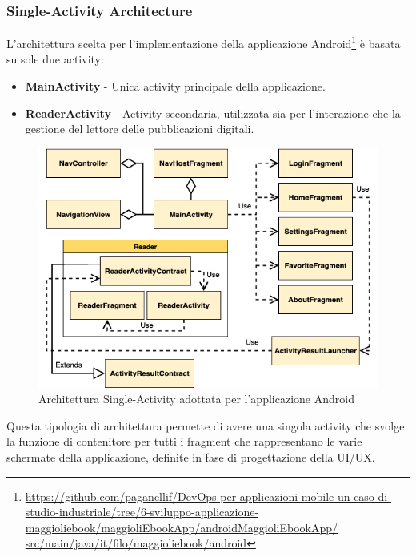 \subsubsection*{Single-Activity Architecture}
L'architettura scelta per l'implementazione della applicazione Android\footnote{\href{https://github.com/paganellif/DevOps-per-applicazioni-mobile-un-caso-di-studio-industriale/tree/6-sviluppo-applicazione-maggioliebook/maggioliEbookApp/androidMaggioliEbookApp/src/main/java/it/filo/maggioliebook/android}{https://github.com/paganellif/DevOps-per-applicazioni-mobile-un-caso-di-studio-industriale/tree/6-sviluppo-applicazione-maggioliebook/maggioliEbookApp/androidMaggioliEbookApp/\\src/main/java/it/filo/maggioliebook/android}} è basata su sole due activity:

\begin{itemize}
    \item \textbf{MainActivity} - Unica activity principale della applicazione.
    \item \textbf{ReaderActivity} - Activity secondaria, utilizzata sia per l'interazione che la gestione del lettore delle pubblicazioni digitali.
\end{itemize}

\begin{figure}[H]
    \centering
    \includegraphics[width=1\textwidth]{img/android-arch.png}
    \caption{Architettura Single-Activity adottata per l'applicazione Android}
    \label{android-arch-png}
\end{figure}

Questa tipologia di architettura permette di avere una singola activity che svolge la funzione di contenitore per tutti i fragment che rappresentano le varie schermate della applicazione, definite in fase di progettazione della UI/UX.

